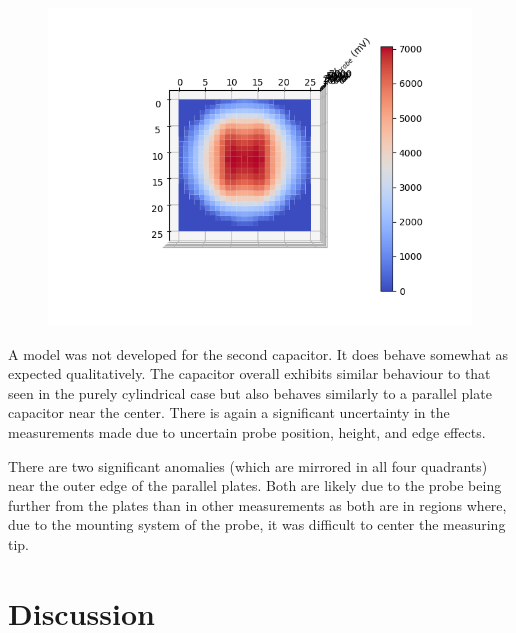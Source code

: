 \documentclass[10pt, twocolumn]{article}
\theoremstyle{definition}
\begin{document}
\begin{figure}
\begin{minipage}{.5\textwidth}
    \label{fig:ppc-results-so}
  \end{minipage}%
  \hspace{.1\textwidth}%
  \begin{minipage}{.5\textwidth}
    \centering
    \includegraphics[width=\linewidth]{hplot-topdown.png}
    \label{fig:ppc-results-td}
  \end{minipage}%
\end{figure}
A model was not developed for the second capacitor. It does behave somewhat as expected qualitatively. The capacitor overall exhibits
similar behaviour to that seen in the purely cylindrical case but also behaves similarly to a parallel plate capacitor
near the center. There is again a significant uncertainty in the measurements made due to uncertain probe position, height,
and edge effects.

There are two significant anomalies (which are mirrored in all four quadrants) near the outer edge of the parallel plates.
Both are likely due to the probe being further from the plates than in other measurements as both are in regions where, due to the
mounting system of the probe, it was difficult to center the measuring tip.
\section{Discussion}
\end{document}
